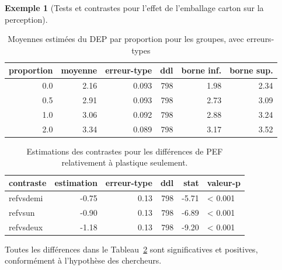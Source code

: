 \documentclass[
  11pt,
  letterpaper,
]{scrbook}
\theoremstyle{definition}
\theoremstyle{plain}
\theoremstyle{definition}
\newtheorem{example}{Exemple}[chapter]
\theoremstyle{plain}
\theoremstyle{remark}
\begin{document}
\begin{example}[Tests et contrastes pour l'effet de l'emballage carton
sur la
perception]
\begin{longtable}[t]{rrrrrr}

\caption{\label{tbl-print-groupmeans-PEF}Moyennes estimées du DEP par
proportion pour les groupes, avec erreurs-types}

\tabularnewline

\toprule
proportion & moyenne & erreur-type & ddl & borne inf. & borne sup.\\
\midrule
0.0 & 2.16 & 0.093 & 798 & 1.98 & 2.34\\
0.5 & 2.91 & 0.093 & 798 & 2.73 & 3.09\\
1.0 & 3.06 & 0.092 & 798 & 2.88 & 3.24\\
2.0 & 3.34 & 0.089 & 798 & 3.17 & 3.52\\
\bottomrule

\end{longtable}

\begin{longtable}[t]{lrrrrl}

\caption{\label{tbl-print-contrast-PEF}Estimations des contrastes pour
les différences de PEF relativement à plastique seulement.}

\tabularnewline

\toprule
contraste & estimation & erreur-type & ddl & stat & valeur-p\\
\midrule
refvsdemi & -0.75 & 0.13 & 798 & -5.71 & < 0.001\\
refvsun & -0.90 & 0.13 & 798 & -6.89 & < 0.001\\
refvsdeux & -1.18 & 0.13 & 798 & -9.20 & < 0.001\\
\bottomrule

\end{longtable}

Toutes les différences dans le Tableau~\ref{tbl-print-contrast-PEF} sont
significatives et positives, conformément à l'hypothèse des chercheurs.

\end{example}
\end{document}
